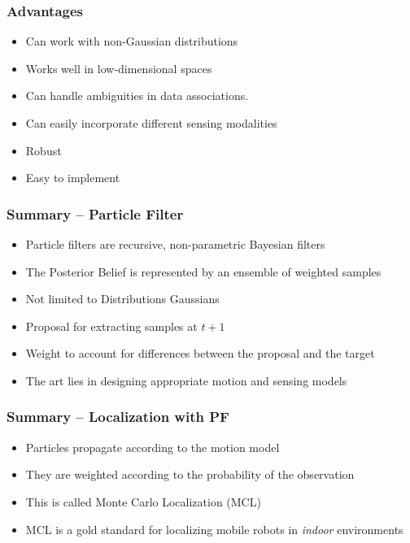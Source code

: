 \begin{frame}
    \frametitle{Advantages}
    
    \begin{itemize}
        \item Can work with non-Gaussian distributions
        \item Works well in low-dimensional spaces
        \item Can handle ambiguities in data associations. 
        \item Can easily incorporate different sensing modalities 
        \item Robust 
        \item Easy to implement
    \end{itemize}
\end{frame}
    
\begin{frame}
    \frametitle{Summary – Particle Filter}
    
    \begin{itemize}
        \item Particle filters are recursive, non-parametric Bayesian filters
        \item The Posterior Belief is represented by an ensemble of weighted samples
        \item Not limited to Distributions Gaussians
        \item Proposal for extracting samples at $t+1$
        \item Weight to account for differences between the proposal and the target
        \item The art lies in designing appropriate motion and sensing models
    \end{itemize}
\end{frame}
    
\begin{frame}
    \frametitle{Summary – Localization with PF}
    
    \begin{itemize}
        \item Particles propagate according to the motion model
        \item They are weighted according to the probability of the observation
        \item This is called Monte Carlo Localization (MCL)
        \item MCL is a gold standard for localizing mobile robots in \emph{indoor} environments
    \end{itemize}
\end{frame}